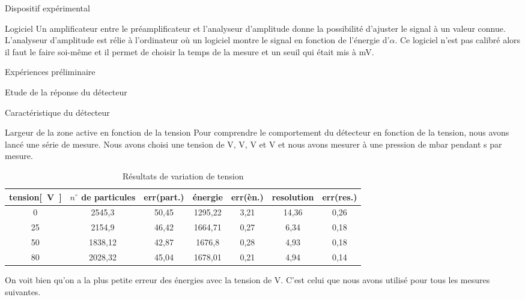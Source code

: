 \documentclass[a4paper,11pt]{scrartcl}
\begin{document}
\begin{section}{Dispositif expérimental}
  \begin{subsection}{Logiciel}
   Un amplificateur entre le préamplificateur et l'analyseur d'amplitude donne la possibilité d'ajuster le signal à un valeur connue. L'analyseur d'amplitude est rélie à l'ordinateur où un logiciel montre le signal en fonction de l'énergie d'$\alpha$. Ce logiciel n'est pas calibré alors il faut le faire soi-même et il permet de choisir la temps de la mesure et un seuil qui était mis à \unit[200]{mV}.
  \end{subsection}
 \end{section}
  
 \begin{section}{Expériences préliminaire}
  \begin{subsection}{Etude de la réponse du détecteur}
   \begin{subsubsection}{Caractéristique du détecteur}
   \end{subsubsection}
   \begin{subsubsection}{Largeur de la zone active en fonction de la tension}
    Pour comprendre le comportement du détecteur en fonction de la tension, nous avons lancé une série de mesure. Nous avons choisi une tension de \unit[0]{V}, \unit[25]{V}, \unit[50]{V} et \unit[80]{V} et nous avons mesurer à une pression de \unit[0,78]{mbar} pendant \unit[30]{s} par mesure.
    \begin{table}[htbp]
     \caption{Résultats de variation de tension}
     \begin{center}
      \begin{tabular}{|c||c|c|c|c|c|c|}
       \hline
       tension\unit{[V]} & $n^{\circ}$ de particules	& err(part.) & énergie	&	err(èn.)	& resolution & err(res.)	\\ \hline \hline 
       0	&	2545,3	&	50,45	&	1295,22	&	3,21	&	14,36	&	0,26		\\ \hline
       25	&	2154,9	&	46,42	&	1664,71	&	0,27	&	6,34	&	0,18		\\ \hline
       50	&	1838,12	&	42,87	&	1676,8	&	0,28	&	4,93	&	0,18		\\ \hline
       80	&	2028,32	&	45,04	&	1678,01	&	0,21	&	4,94	&	0,14		\\ \hline
      \end{tabular}
     \end{center}
    \end{table}
    On voit bien qu'on a la plus petite erreur des énergies avec la tension de \unit[80]{V}. C'est celui que nous avons utilisé pour tous les mesures suivantes. 
   \end{subsubsection}
  \end{subsection} 


\end{section}
\end{document}
